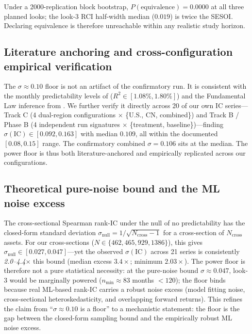 \documentclass[11pt,a4paper]{article}
\begin{document}
Under a 2000-replication block bootstrap, $P(\text{equivalence}) = 0.0000$ at all
three planned looks; the look-3 RCI half-width median ($0.019$) is twice the SESOI.
Declaring equivalence is therefore unreachable within any realistic study horizon.

\subsection{Literature anchoring and cross-configuration empirical verification}

The $\sigma\!\approx\!0.10$ floor is not an artifact of the confirmatory run.
It is consistent with the monthly predictability levels of
\citet{gu2020empirical} ($R^2 \in [1.08\%, 1.80\%]$) and the Fundamental Law
inference from \citet{grinold1999active}. We further verify it directly across 20
of our own IC series---Track C (4 dual-region configurations $\times$ \{U.S., CN,
combined\}) and Track B / Phase B (4 independent run signatures $\times$
\{treatment, baseline\})---finding $\sigma(\text{IC}) \in [0.092, 0.163]$ with median
$0.109$, all within the documented $[0.08, 0.15]$ range. The confirmatory combined
$\sigma = 0.106$ sits at the median. The power floor is thus both literature-anchored
and empirically replicated across our configurations.

\subsection{Theoretical pure-noise bound and the ML noise excess}

The cross-sectional Spearman rank-IC under the null of no predictability has the
closed-form standard deviation $\sigma_{\text{null}} = 1/\sqrt{N_{\text{cross}}-1}$
for a cross-section of $N_{\text{cross}}$ assets. For our cross-sections
($N \in \{462, 465, 929, 1386\}$), this gives $\sigma_{\text{null}} \in [0.027, 0.047]$---yet
the observed $\sigma(\text{IC})$ across 21 series is consistently
\emph{2.0--4.4$\times$} this bound (median excess $3.4\times$; minimum $2.03\times$).
The power floor is therefore not a pure statistical necessity: at the pure-noise
bound $\sigma \approx 0.047$, look-3 would be marginally powered ($n_{\min} \approx 83$
months $< 120$); the floor binds because real ML-based rank-IC carries a robust
noise excess (model fitting noise, cross-sectional heteroskedasticity, and
overlapping forward returns). This refines the claim from ``$\sigma \approx 0.10$ is
a floor'' to a mechanistic statement: the floor is the gap between the closed-form
sampling bound and the empirically robust ML noise excess.
\end{document}
